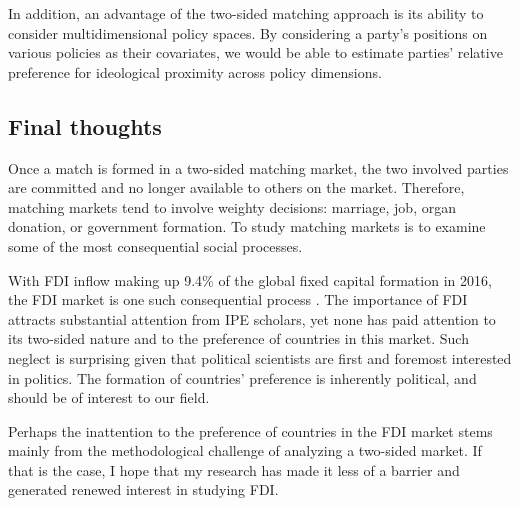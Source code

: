 In addition, an advantage of the two-sided matching approach is its ability to
consider multidimensional policy spaces. By considering a party's positions on
various policies as their covariates, we would be able to estimate parties'
relative preference for ideological proximity across policy dimensions.

\subsection{Final thoughts}

Once a match is formed in a two-sided matching market, the two involved parties
are committed and no longer available to others on the market. Therefore,
matching markets tend to involve weighty decisions: marriage, job, organ
donation, or government formation. To study matching markets is to examine some
of the most consequential social processes.

With FDI inflow making up 9.4\% of the global fixed capital formation in 2016,
the FDI market is one such consequential process \citep{UNCTAD2017}. The
importance of FDI attracts substantial attention from IPE scholars, yet none has
paid attention to its two-sided nature and to the preference of countries in
this market. Such neglect is surprising given that political scientists
are first and foremost interested in politics. The formation of countries'
preference is inherently political, and should be of interest to our field.

Perhaps the inattention to the preference of countries in the FDI market stems
mainly from the methodological challenge of analyzing a two-sided market. If
that is the case, I hope that my research has made it less of a barrier and
generated renewed interest in studying FDI.

